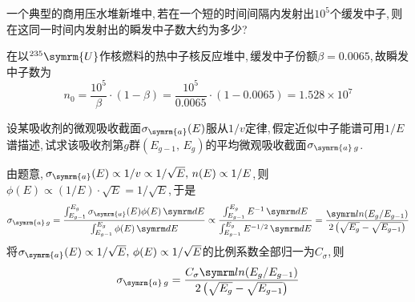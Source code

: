 \begin{exercise}
    一个典型的商用压水堆新堆中,\,若在一个短的时间间隔内发射出$10^5$个缓发中子,\,则在这同一时间内发射出的瞬发中子数大约为多少?
    \begin{solution}
        在以${}^{235}\symrm{U}$作核燃料的热中子核反应堆中,\,缓发中子份额$\beta = 0.0065$,\,故瞬发中子数为
        \begin{equation*}
            n_0 = \frac{10^5}{\beta} \cdot (1-\beta) = \frac{10^5}{0.0065} \cdot (1-0.0065) = 1.528 \times 10^{7}
        \end{equation*}
    \end{solution}
\end{exercise}

\begin{exercise}
    设某吸收剂的微观吸收截面$\sigma_{\symrm{a}}(E)$服从$1/v$定律,\,假定近似中子能谱可用$1/E$谱描述,\,试求该吸收剂第$g$群$(E_{g-1},\,E_g)$的平均微观吸收截面$\sigma_{\symrm{a}\,g}$.\,
    \begin{solution}
        由题意,\,$\sigma_{\symrm{a}}(E) \propto 1/v \propto 1/\sqrt{E},\,n(E) \propto 1/E$,\,则$\phi(E) \propto (1/E) \cdot \sqrt{E} = 1/\sqrt{E}$,\,于是
        \begin{equation*}
            \sigma_{\symrm{a}\,g} = \frac{\int_{E_{g-1}}^{E_g} \sigma_{\symrm{a}}(E) \phi(E) \dd{E}}{\int_{E_{g-1}}^{E_g} \phi(E) \dd{E}} \propto \frac{\int_{E_{g-1}}^{E_g} E^{-1} \dd{E}}{\int_{E_{g-1}}^{E_g} E^{-1/2} \dd{E}} = \frac{\loge (E_g/E_{g-1})}{2\left(\sqrt{E_g} - \sqrt{E_{g-1}}\right)}
        \end{equation*}
        将$\sigma_{\symrm{a}}(E) \propto 1/\sqrt{E},\,\phi(E) \propto 1/\sqrt{E}$的比例系数全部归一为$C_{\sigma}$,\,则
        \begin{equation*}
            \sigma_{\symrm{a}\,g} = \frac{C_{\sigma} \loge (E_g/E_{g-1})}{2\left(\sqrt{E_g} - \sqrt{E_{g-1}}\right)}
        \end{equation*}
    \end{solution}
\end{exercise}